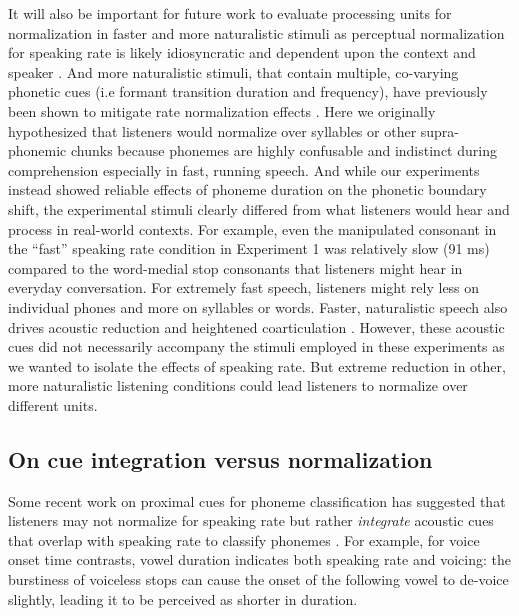 It will also be important for future work to evaluate processing units for normalization in faster and more naturalistic stimuli as perceptual normalization for speaking rate is likely idiosyncratic and dependent upon the context and speaker \citep{goldingerPuzzlesolvingScienceQuixotic2003}. And more naturalistic stimuli, that contain multiple, co-varying phonetic cues (i.e formant transition duration and frequency), have previously been shown to mitigate rate normalization effects \citep{shinnLimitationsContextConditioned1985}. Here we originally hypothesized that listeners would normalize over syllables or other supra-phonemic chunks because phonemes are highly confusable and indistinct during comprehension especially in fast, running speech. And while our experiments instead showed reliable effects of phoneme duration on the phonetic boundary shift, the experimental stimuli clearly differed from what listeners would hear and process in real-world contexts. For example, even the manipulated consonant in the ``fast'' speaking rate condition in Experiment 1 was relatively slow (91 ms) compared to the word-medial stop consonants that listeners might hear in everyday conversation. For extremely fast speech, listeners might rely less on individual phones and more on syllables or words. Faster, naturalistic speech also drives acoustic reduction and heightened coarticulation \citep{fourakisTempoStressVowel1991,gayMechanismsControlSpeech1981}. However, these acoustic cues did not necessarily accompany the stimuli employed in these experiments as we wanted to isolate the effects of speaking rate. But extreme reduction in other, more naturalistic listening conditions could lead listeners to normalize over different units. 

\subsection{On cue integration versus normalization}

Some recent work on proximal cues for phoneme classification has suggested that listeners may not normalize for speaking rate but rather \textit{integrate} acoustic cues that overlap with speaking rate to classify phonemes \citep{toscanoCueIntegrationCategories2010,toscanoCueintegrationContextEffects2012}. For example, for voice onset time contrasts, vowel duration indicates both speaking rate and voicing: the burstiness of voiceless stops can cause the onset of the following vowel to de-voice slightly, leading it to be perceived as shorter in duration. 

